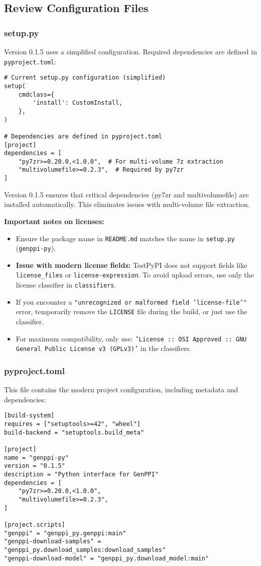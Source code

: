 \documentclass[11pt, a4paper]{article}
\begin{document}
\subsection{Review Configuration Files}
\subsubsection{setup.py}
Version 0.1.5 uses a simplified configuration. Required dependencies are defined in \texttt{pyproject.toml}:
\begin{lstlisting}[style=pythonstyle]
# Current setup.py configuration (simplified)
setup(
    cmdclass={
        'install': CustomInstall,
    },
)

# Dependencies are defined in pyproject.toml
[project]
dependencies = [
    "py7zr>=0.20.0,<1.0.0",  # For multi-volume 7z extraction
    "multivolumefile>=0.2.3",  # Required by py7zr
]
\end{lstlisting}
Version 0.1.5 ensures that critical dependencies (py7zr and multivolumefile) are installed automatically. This eliminates issues with multi-volume file extraction.

\textbf{Important notes on licenses:} 
\begin{itemize}
    \item Ensure the package name in \texttt{README.md} matches the name in \texttt{setup.py} (\texttt{genppi-py}).
    \item \textbf{Issue with modern license fields:} TestPyPI does not support fields like \texttt{license\_files} or \texttt{license-expression}. To avoid upload errors, use only the license classifier in \texttt{classifiers}.
    \item If you encounter a \texttt{"unrecognized or malformed field 'license-file'"} error, temporarily remove the \texttt{LICENSE} file during the build, or just use the classifier.
    \item For maximum compatibility, only use: \texttt{'License :: OSI Approved :: GNU General Public License v3 (GPLv3)'} in the classifiers.
\end{itemize}

\subsubsection{pyproject.toml}
This file contains the modern project configuration, including metadata and dependencies:
\begin{lstlisting}[style=bashstyle]
[build-system]
requires = ["setuptools>=42", "wheel"]
build-backend = "setuptools.build_meta"

[project]
name = "genppi-py"
version = "0.1.5"
description = "Python interface for GenPPI"
dependencies = [
    "py7zr>=0.20.0,<1.0.0",
    "multivolumefile>=0.2.3",
]

[project.scripts]
"genppi" = "genppi_py.genppi:main"
"genppi-download-samples" = "genppi_py.download_samples:download_samples"
"genppi-download-model" = "genppi_py.download_model:main"
\end{lstlisting}
\end{document}
